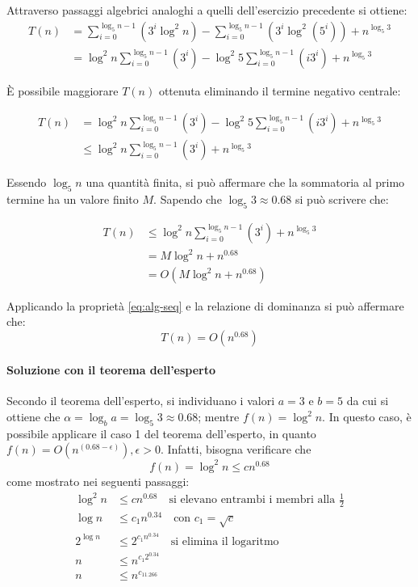 \documentclass{article}
\begin{document}
Attraverso passaggi algebrici analoghi a quelli dell'esercizio precedente si ottiene:
\begin{align*}
    T(n) &= \sum_{i=0}^{\log_5 n-1} (3^i\log^2 n) -  \sum_{i=0}^{\log_5 n-1} (3^i\log^2 (5^i)) + n^{\log_5 3} \\
    &= \log^2 n \sum_{i=0}^{\log_5 n-1} (3^i) - \log^2 5 \sum_{i=0}^{\log_5 n-1} (i 3^i) + n^{\log_5 3}
\end{align*}

È possibile maggiorare $T(n)$ ottenuta eliminando il termine negativo centrale:

\begin{align*}
    T(n) &= \log^2 n \sum_{i=0}^{\log_5 n-1} (3^i) - \log^2 5 \sum_{i=0}^{\log_5 n-1} (i 3^i) + n^{\log_5 3}\\
    &\leq \log^2 n \sum_{i=0}^{\log_5 n-1} (3^i) + n^{\log_5 3}
\end{align*}

Essendo $\log_5 n$ una quantità finita, si può affermare che la sommatoria al primo termine ha un valore finito $M$. Sapendo che $\log_5 3 \approx 0.68$ si può scrivere che:

\begin{align*}
    T(n) &\leq \log^2 n \sum_{i=0}^{\log_5 n-1} (3^i) + n^{\log_5 3}\\
    &= M\log^2 n + n^{0.68}\\
    &= O(M\log^2 n + n^{0.68})
\end{align*}

Applicando la proprietà \cref{eq:alg-seq} e la relazione di dominanza si può affermare che:
\begin{equation*}
    T(n) = O(n^{0.68})
\end{equation*}


\paragraph{Soluzione con il teorema dell'esperto}
Secondo il teorema dell'esperto, si individuano i valori $a = 3$ e $b = 5$ da cui si ottiene che $\alpha = \log_b a = \log_5 3 \approx 0.68$; mentre $f(n) = \log^2 n$. In questo caso, è possibile applicare il caso 1 del teorema dell'esperto, in quanto $f(n) = O(n^{(0.68-\epsilon)}), \epsilon > 0$. Infatti, bisogna verificare che $$f(n) = \log^2 n \leq c n^{0.68}$$ come mostrato nei seguenti passaggi:
\begin{align*}
    \log^2 n &\leq c n^{0.68} \quad \text{si elevano entrambi i membri alla $\frac{1}{2}$}\\
    \log n &\leq c_1 n^{0.34} \quad \text{con $c_1 =\sqrt{c} $}\\
    2^{\log n} &\leq 2^{c_1 n^{0.34}} \quad \text{si elimina il logaritmo}\\
    n &\leq n^{c_1 2^{0.34}} \\
    n &\leq n^{c_11.266}
\end{align*}
\end{document}

